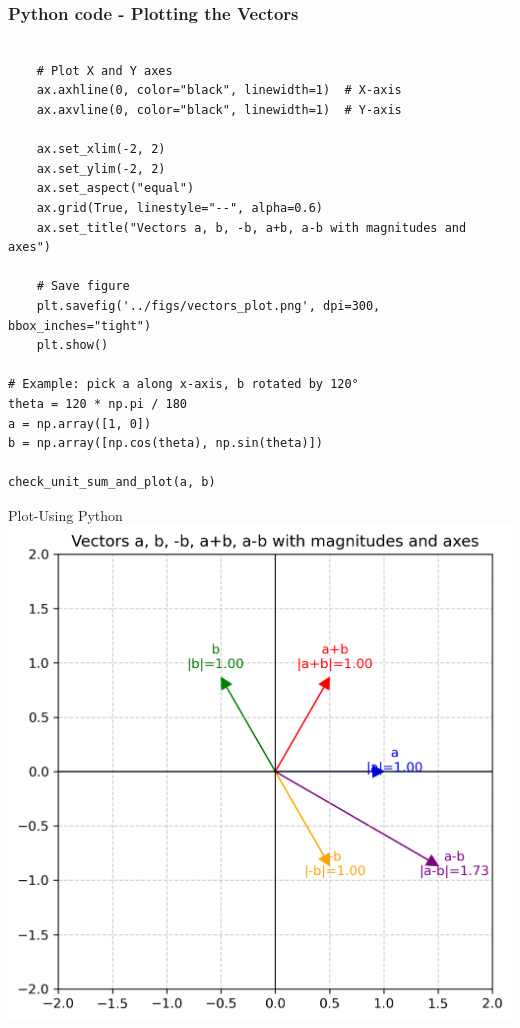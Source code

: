 \documentclass{beamer}
\begin{document}
\begin{frame}[fragile]                            
\frametitle{Python code - Plotting the Vectors}                
\begin{lstlisting}
 
    # Plot X and Y axes
    ax.axhline(0, color="black", linewidth=1)  # X-axis
    ax.axvline(0, color="black", linewidth=1)  # Y-axis
    
    ax.set_xlim(-2, 2)
    ax.set_ylim(-2, 2)
    ax.set_aspect("equal")
    ax.grid(True, linestyle="--", alpha=0.6)
    ax.set_title("Vectors a, b, -b, a+b, a-b with magnitudes and axes")
    
    # Save figure
    plt.savefig('../figs/vectors_plot.png', dpi=300, bbox_inches="tight")
    plt.show()

# Example: pick a along x-axis, b rotated by 120°
theta = 120 * np.pi / 180
a = np.array([1, 0])
b = np.array([np.cos(theta), np.sin(theta)])

check_unit_sum_and_plot(a, b)
\end{lstlisting}


\end{frame}
\begin{frame}{Plot-Using  Python}
    \centering
    \includegraphics[width=\columnwidth, height=0.8\textheight, keepaspectratio]{../figs/vectors_plot.png}     
\end{frame}
\end{document}
